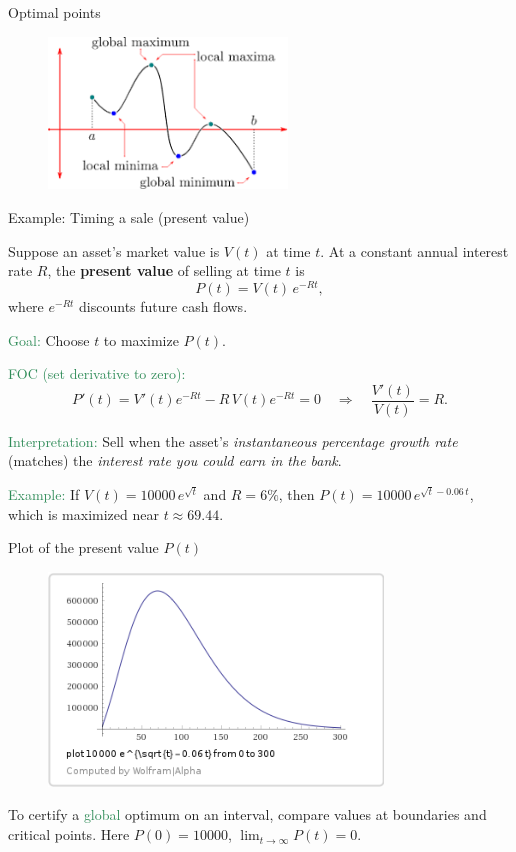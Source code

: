 \documentclass[11pt,aspectratio=169]{beamer}
\begin{document}
\begin{frame}{Optimal points}
\begin{figure}
\includegraphics[width=2.5in]{img/max_min} 
\end{figure}
\end{frame}


\begin{frame}{Example: Timing a sale (present value)}

Suppose an asset’s market value is $V(t)$ at time $t$.  
At a constant annual interest rate $R$, the \textbf{present value} of selling at time $t$ is
\[
P(t) = V(t)\,e^{-Rt},
\]
where $e^{-Rt}$ discounts future cash flows.

\smallskip
\textcolor{SeaGreen}{Goal:} Choose $t$ to maximize $P(t)$.

\smallskip
\textcolor{SeaGreen}{FOC (set derivative to zero):}
\[
P'(t) = V'(t)e^{-Rt} - R\,V(t)e^{-Rt} = 0
\quad\Rightarrow\quad \frac{V'(t)}{V(t)} = R.
\]

\textcolor{SeaGreen}{Interpretation:} Sell when the asset’s \emph{instantaneous percentage growth rate}  
(matches) the \emph{interest rate you could earn in the bank}.

\bigskip
\textcolor{SeaGreen}{Example:} If $V(t) = 10000\,e^{\sqrt{t}}$ and $R = 6\%$,  
then $P(t) = 10000\,e^{\sqrt{t} - 0.06\,t}$, which is maximized near $t \approx 69.44$.
\end{frame}
\begin{frame}{Plot of the present value $P(t)$}
\begin{figure}
\includegraphics[width=3.5in]{img/plot} 
\end{figure}
To certify a \textcolor{SeaGreen}{global} optimum on an interval, compare values at boundaries and critical points. Here $P(0)=10000$, $\lim_{t\to\infty}P(t)=0$.
\end{frame}
\end{document}

